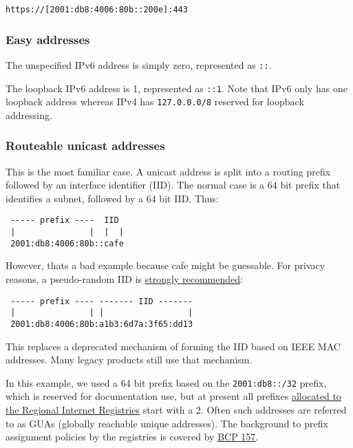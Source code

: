 \documentclass[
]{article}
\begin{document}
\begin{verbatim}
https://[2001:db8:4006:80b::200e]:443
\end{verbatim}

\subsubsection{Easy addresses}\label{easy-addresses}

The unspecified IPv6 address is simply zero, represented as \texttt{::}.

The loopback IPv6 address is 1, represented as \texttt{::1}. Note that
IPv6 only has one loopback address whereas IPv4 has \texttt{127.0.0.0/8}
reserved for loopback addressing.

\subsubsection{Routeable unicast
addresses}\label{routeable-unicast-addresses}

This is the most familiar case. A unicast address is split into a
routing prefix followed by an interface identifier (IID). The normal
case is a 64 bit prefix that identifies a subnet, followed by a 64 bit
IID. Thus:

\begin{verbatim}
 ----- prefix ----  IID
 |               |  |  |
 2001:db8:4006:80b::cafe
\end{verbatim}

However, that\textquotesingle s a bad example because
\textquotesingle cafe\textquotesingle{} might be guessable. For privacy
reasons, a pseudo-random IID is
\href{https://www.rfc-editor.org/info/rfc8064}{strongly recommended}:

\begin{verbatim}
 ----- prefix ---- ------- IID -------
 |               | |                 |
 2001:db8:4006:80b:a1b3:6d7a:3f65:dd13
\end{verbatim}

This replaces a deprecated mechanism of forming the IID based on IEEE
MAC addresses. Many legacy products still use that mechanism.

In this example, we used a 64 bit prefix based on the
\texttt{2001:db8::/32} prefix, which is reserved for documentation use,
but at present all prefixes
\href{https://www.iana.org/assignments/ipv6-unicast-address-assignments/ipv6-unicast-address-assignments.xhtml}{allocated
to the Regional Internet Registries} start with a 2. Often such
addresses are referred to as GUAs (globally reachable unique addresses).
The background to prefix assignment policies by the registries is
covered by \href{https://www.rfc-editor.org/info/bcp157}{BCP 157}.
\end{document}
